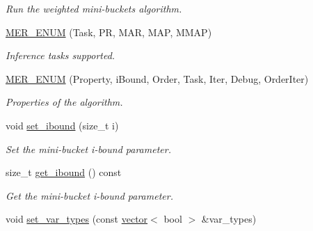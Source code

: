 \begin{DoxyCompactItemize}
\begin{DoxyCompactList}\small\item\em Run the weighted mini-\/buckets algorithm. \end{DoxyCompactList}\item 
\hyperlink{classmerlin_1_1wmb_af800e4c2c35e845cc47bab94ef156aac}{M\+E\+R\+\_\+\+E\+N\+UM} (Task, PR, M\+AR, M\+AP, M\+M\+AP)\hypertarget{classmerlin_1_1wmb_af800e4c2c35e845cc47bab94ef156aac}{}\label{classmerlin_1_1wmb_af800e4c2c35e845cc47bab94ef156aac}

\begin{DoxyCompactList}\small\item\em Inference tasks supported. \end{DoxyCompactList}\item 
\hyperlink{classmerlin_1_1wmb_add42202a2c38f0a65f1de8ddcbbb08f8}{M\+E\+R\+\_\+\+E\+N\+UM} (Property, i\+Bound, Order, Task, Iter, Debug, Order\+Iter)\hypertarget{classmerlin_1_1wmb_add42202a2c38f0a65f1de8ddcbbb08f8}{}\label{classmerlin_1_1wmb_add42202a2c38f0a65f1de8ddcbbb08f8}

\begin{DoxyCompactList}\small\item\em Properties of the algorithm. \end{DoxyCompactList}\item 
void \hyperlink{classmerlin_1_1wmb_a0d1389be67caece79708d4914ff03185}{set\+\_\+ibound} (size\+\_\+t i)\hypertarget{classmerlin_1_1wmb_a0d1389be67caece79708d4914ff03185}{}\label{classmerlin_1_1wmb_a0d1389be67caece79708d4914ff03185}

\begin{DoxyCompactList}\small\item\em Set the mini-\/bucket i-\/bound parameter. \end{DoxyCompactList}\item 
size\+\_\+t \hyperlink{classmerlin_1_1wmb_ae625b40db68f51aadb954da99e48bc52}{get\+\_\+ibound} () const \hypertarget{classmerlin_1_1wmb_ae625b40db68f51aadb954da99e48bc52}{}\label{classmerlin_1_1wmb_ae625b40db68f51aadb954da99e48bc52}

\begin{DoxyCompactList}\small\item\em Get the mini-\/bucket i-\/bound parameter. \end{DoxyCompactList}\item 
void \hyperlink{classmerlin_1_1wmb_a0dcda9d7c557d77435aa0363e793018e}{set\+\_\+var\+\_\+types} (const \hyperlink{classmerlin_1_1vector}{vector}$<$ bool $>$ \&var\+\_\+types)\hypertarget{classmerlin_1_1wmb_a0dcda9d7c557d77435aa0363e793018e}{}\label{classmerlin_1_1wmb_a0dcda9d7c557d77435aa0363e793018e}


\end{DoxyCompactItemize}
